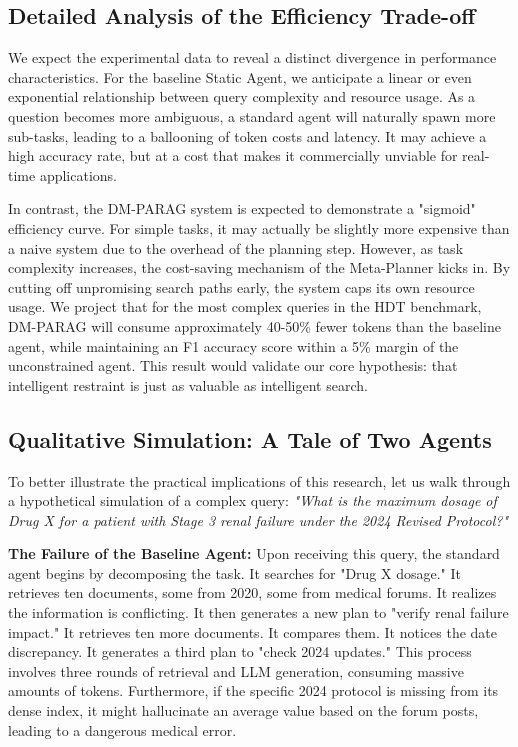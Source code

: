 \documentclass[12pt,en]{elegantpaper}
\begin{document}
\subsection{Detailed Analysis of the Efficiency Trade-off}

We expect the experimental data to reveal a distinct divergence in performance characteristics. For the baseline Static Agent, we anticipate a linear or even exponential relationship between query complexity and resource usage. As a question becomes more ambiguous, a standard agent will naturally spawn more sub-tasks, leading to a ballooning of token costs and latency. It may achieve a high accuracy rate, but at a cost that makes it commercially unviable for real-time applications.

In contrast, the DM-PARAG system is expected to demonstrate a "sigmoid" efficiency curve. For simple tasks, it may actually be slightly more expensive than a naive system due to the overhead of the planning step. However, as task complexity increases, the cost-saving mechanism of the Meta-Planner kicks in. By cutting off unpromising search paths early, the system caps its own resource usage. We project that for the most complex queries in the HDT benchmark, DM-PARAG will consume approximately 40-50\% fewer tokens than the baseline agent, while maintaining an F1 accuracy score within a 5\% margin of the unconstrained agent. This result would validate our core hypothesis: that intelligent restraint is just as valuable as intelligent search.

\subsection{Qualitative Simulation: A Tale of Two Agents}

To better illustrate the practical implications of this research, let us walk through a hypothetical simulation of a complex query: \textit{"What is the maximum dosage of Drug X for a patient with Stage 3 renal failure under the 2024 Revised Protocol?"}

\textbf{The Failure of the Baseline Agent:}
Upon receiving this query, the standard agent begins by decomposing the task. It searches for "Drug X dosage." It retrieves ten documents, some from 2020, some from medical forums. It realizes the information is conflicting. It then generates a new plan to "verify renal failure impact." It retrieves ten more documents. It compares them. It notices the date discrepancy. It generates a third plan to "check 2024 updates." This process involves three rounds of retrieval and LLM generation, consuming massive amounts of tokens. Furthermore, if the specific 2024 protocol is missing from its dense index, it might hallucinate an average value based on the forum posts, leading to a dangerous medical error.
\end{document}
